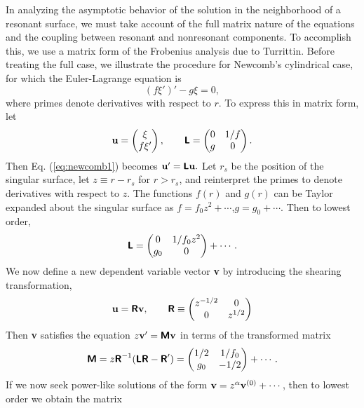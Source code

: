 \documentclass[prb,twocolumn,showpacs,preprintnumbers,amsmath,amssymb]{revtex4}
\renewcommand*{\v}[1]{\hbox{\bfseries #1}}
\renewcommand*{\t}[1]{\hbox{\sffamily\bfseries #1}}
\begin{document}
In analyzing the asymptotic behavior of the solution in the neighborhood
of a resonant surface, we must take account of the full matrix nature of
the equations and the coupling between resonant and nonresonant
components.  To accomplish this, we use a matrix form of the Frobenius
analysis due to Turrittin.\cite{hlt55} Before treating the full case, we
illustrate the procedure for Newcomb's cylindrical case, for which the
Euler-Lagrange equation is
\begin{equation}
(f \xi')' - g \xi = 0,
\label{eq:newcomb1}
\end{equation}
where primes denote derivatives with respect to $r$.  To express this in
matrix form, let
\[
\v{u} = \left( \begin{matrix} \xi \\ f \xi' \end{matrix} \right), \qquad
\t{L} = \left( \begin{matrix} 0 & 1/f \\ g & 0 \end{matrix} \right).
\]
Then Eq. (\ref{eq:newcomb1}) becomes $\v{u}' = \t{L} \v{u}.$ Let $r_s$
be the position of the singular surface, let $z \equiv r - r_s$ for $r >
r_s$, and reinterpret the primes to denote derivatives with respect to
$z$.  The functions $f(r)$ and $g(r)$ can be Taylor expanded about the
singular surface as $f = f_0 z^2 + \cdots$,$g = g_0 + \cdots.$ Then to
lowest order,
\[
\t{L} = \left( \begin{matrix} 0 & 1/f_0 z^2 \\ g_0 & 0
	\end{matrix} \right) + \cdots. 
\]
We now define a new dependent variable vector \v{v} by introducing the
shearing transformation,
\begin{equation}
\v{u} = \t{R} \v{v}, \qquad 
\t{R} \equiv \left( \begin{matrix} z^{-1/2} & 0 \\ 0 & z^{1/2}
	\end{matrix} \right)
\label{eq:shear_cyl}
\end{equation}
Then \v{v} satisfies the equation $z \v{v}' = \t{M} \v{v}$ in terms of
the transformed matrix
\[
\t{M} = z \t{R}^{-1} (\t{L} \t{R} - \t{R}')
= \left( \begin{matrix} 1/2 & 1/f_0 \\ g_0 & -1/2 \end{matrix} \right) +
\cdots.
\]
If we now seek power-like solutions of the form $\v{v} = z^\alpha
\v{v}^{(0)} + \cdots$, then to lowest order we obtain the matrix
\end{document}
